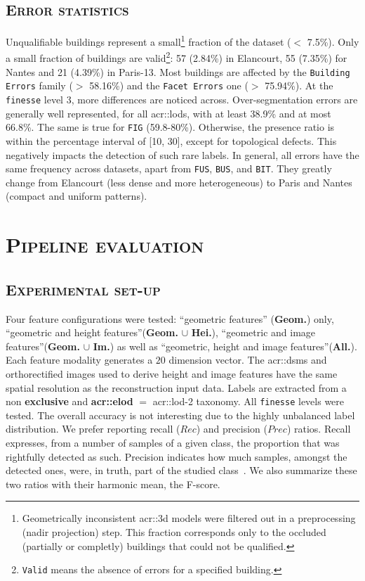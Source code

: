     \subsection{\textsc{Error statistics}}
        Unqualifiable buildings represent a small\footnote{
            Geometrically inconsistent \gls{acr::3d} models were filtered out in a preprocessing (nadir projection) step.
            This fraction corresponds only to the occluded (partially or completly) buildings that could not be qualified.
        } fraction of the dataset ($<$ 7.5\%).
        Only a small fraction of buildings are valid\footnote{
            \texttt{Valid} means the absence of errors for a specified building.
        }:
        57 (2.84\%) in Elancourt, 55 (7.35\%) for Nantes and 21 (4.39\%) in Paris-13.
        Most buildings are affected by the \texttt{Building Errors} family ($>$ 58.16\%) and the \texttt{Facet Errors} one ($>$ 75.94\%).
        At the \texttt{finesse} level 3, more differences are noticed across.
        Over-segmentation errors are generally well represented, for all \gls{acr::lod}s, with at least 38.9\% and at most 66.8\%.
        The same is true for \texttt{FIG} (59.8-80\%).
        Otherwise, the presence ratio is within the percentage interval of [10, 30], except for topological defects.
        This negatively impacts the detection of such rare labels.
        In general, all errors have the same frequency across datasets, apart from \texttt{FUS}, \texttt{BUS}, and \texttt{BIT}.
        They greatly change from Elancourt (less dense and more heterogeneous) to Paris and Nantes (compact and uniform patterns).

\section{\textsc{Pipeline evaluation}}
    \subsection{\textsc{Experimental set-up}}
        Four feature configurations were tested: ``geometric features'' (\textbf{Geom.}) only, ``geometric and height features''(\textbf{Geom.} $\cup$ \textbf{Hei.}), ``geometric and image features''(\textbf{Geom.} $\cup$ \textbf{Im.}) as well as ``geometric, height and image features''(\textbf{All.}).
        Each feature modality generates a $20$ dimension vector.
        The \gls{acr::dsm}s and orthorectified images used to derive height and image features have the same spatial resolution as the reconstruction input data.
        Labels are extracted from a non \textbf{exclusive} and \textbf{\gls{acr::elod}} $=$ \gls{acr::lod}-2 taxonomy.
        All \texttt{finesse} levels were tested. The overall accuracy is not interesting due to the highly unbalanced label distribution.
        We prefer reporting recall ($Rec$) and precision ($Prec$) ratios.
        Recall expresses, from a number of samples of a given class, the proportion that was rightfully detected as such.
        Precision indicates how much samples, amongst the detected ones, were, in truth, part of the studied class~\parencite{powers2011evaluation}.
        We also summarize these two ratios with their harmonic mean, the F-score.

